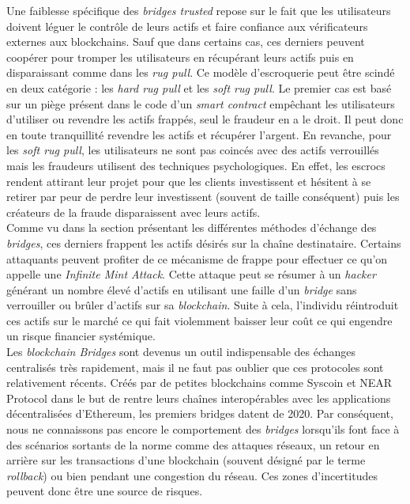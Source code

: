 Une faiblesse spécifique des \textit{bridges trusted} repose sur le fait que les utilisateurs doivent léguer le contrôle de leurs \gls{actif}s et faire confiance aux \gls{vérificateur}s externes aux \gls{blockchain}s. Sauf que dans certains cas, ces derniers peuvent coopérer pour tromper les utilisateurs en récupérant leurs \gls{actif}s puis en disparaissant comme dans les \textit{rug pull}\cite{EthereumRisks}. Ce modèle d’escroquerie peut être scindé en deux catégorie : les \textit{hard rug pull} et les \textit{soft rug pull}\cite{Hacken}. Le premier cas est basé sur un piège présent dans le code d’un \textit{\gls{smart contract}} empêchant les utilisateurs d’utiliser ou revendre les \gls{actif}s frappés, seul le fraudeur en a le droit. Il peut donc en toute tranquillité revendre les \gls{actif}s et récupérer l’argent. En revanche, pour les \textit{soft rug pull}, les utilisateurs ne sont pas coincés avec des \gls{actif}s verrouillés mais les fraudeurs utilisent des techniques psychologiques. En effet, les escrocs rendent attirant leur projet pour que les clients investissent et hésitent à se retirer par peur de perdre leur investissent (souvent de taille conséquent) puis les créateurs de la fraude disparaissent avec leurs \gls{actif}s.\\

Comme vu dans la section présentant les différentes méthodes d’échange des \textit{bridges}, ces derniers frappent les \gls{actif}s désirés sur la chaîne destinataire. Certains attaquants peuvent profiter de ce mécanisme de frappe pour effectuer ce qu’on appelle une \textit{Infinite Mint Attack}.\cite{ChainLinkRisks} Cette attaque peut se résumer à un \textit{hacker} générant un nombre élevé d’\gls{actif}s en utilisant une faille d’un \textit{bridge} sans verrouiller ou brûler d’\gls{actif}s sur sa \textit{\gls{blockchain}}. Suite à cela, l’individu réintroduit ces \gls{actif}s sur le marché ce qui fait violemment baisser leur coût ce qui engendre un risque financier systémique.\\

Les \textit{\gls{blockchain} Bridges} sont devenus un outil indispensable des échanges centralisés très rapidement, mais il ne faut pas oublier que ces protocoles sont relativement récents. Créés par de petites \gls{blockchain}s comme Syscoin et NEAR Protocol dans le but de rentre leurs chaînes interopérables avec les applications décentralisées d’\gls{Ethereum}, les premiers bridges datent de 2020\cite{Bitstamp}. Par conséquent, nous ne connaissons pas encore le comportement des \textit{bridges} lorsqu’ils font face à des scénarios sortants de la norme comme des attaques réseaux, un retour en arrière sur les transactions d’une \gls{blockchain} (souvent désigné par le terme \textit{rollback}) ou bien pendant une congestion du réseau. Ces zones d’incertitudes peuvent donc être une source de risques. \\

